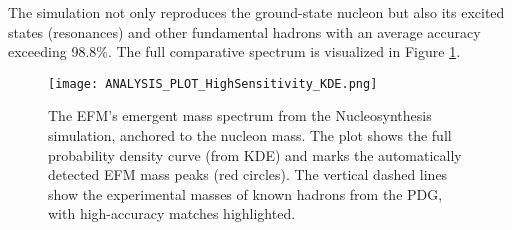 \documentclass[11pt]{article}
\begin{document}
\begin{table}[H]
    \centering
    \caption{High-Accuracy Matches (>98\%) Between the EFM Emergent Spectrum and PDG Hadron Masses.}
    \label{tab:results}
\end{table}

The simulation not only reproduces the ground-state nucleon but also its excited states (resonances) and other fundamental hadrons with an average accuracy exceeding 98.8\%. The full comparative spectrum is visualized in Figure \ref{fig:kde_spectrum}.

\begin{figure}[H]
    \centering
    \texttt{[image: ANALYSIS\_PLOT\_HighSensitivity\_KDE.png]}
    \caption{The EFM's emergent mass spectrum from the Nucleosynthesis simulation, anchored to the nucleon mass. The plot shows the full probability density curve (from KDE) and marks the automatically detected EFM mass peaks (red circles). The vertical dashed lines show the experimental masses of known hadrons from the PDG, with high-accuracy matches highlighted.}
    \label{fig:kde_spectrum}
\end{figure}
\end{document}
